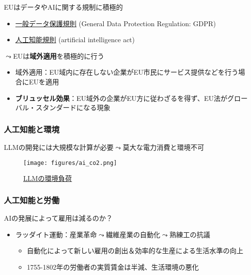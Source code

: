 \documentclass[
  xelatex,
  ja=standard]{bxjsarticle}
\providecommand{\tightlist}{%
  \setlength{\itemsep}{0pt}\setlength{\parskip}{0pt}}\usepackage{longtable,booktabs,array}
\begin{document}
EUはデータやAIに関する規制に積極的

\begin{itemize}
\tightlist
\item
  \href{https://www.ppc.go.jp/enforcement/infoprovision/EU/}{一般データ保護規則}
  (General Data Protection Regulation: GDPR)
\item
  \href{https://www.soumu.go.jp/main_content/000826707.pdf}{人工知能規則}
  (artificial intelligence act)
\end{itemize}

\(\leadsto\)EUは\textbf{域外適用}を積極的に行う

\begin{itemize}
\tightlist
\item
  域外適用：EU域内に存在しない企業がEU市民にサービス提供などを行う場合にEUを適用
\item
  \textbf{ブリュッセル効果}：EU域外の企業がEU方に従わざるを得ず、EU法がグローバル・スタンダードになる現象
\end{itemize}

\hypertarget{ux4ebaux5de5ux77e5ux80fdux3068ux74b0ux5883}{%
\subsubsection{人工知能と環境}\label{ux4ebaux5de5ux77e5ux80fdux3068ux74b0ux5883}}

LLMの開発には大規模な計算が必要\(\leadsto\)莫大な電力消費と環境不可

\begin{figure}[htpb]

{\centering \texttt{[image: figures/ai\_co2.png]}

}

\caption{\href{https://www.gizmodo.jp/2023/04/chatgpt-ai-openai-carbon-emissions-stanford-report.html}{LLMの環境負荷}}

\end{figure}

\hypertarget{ux4ebaux5de5ux77e5ux80fdux3068ux52b4ux50cd}{%
\subsubsection{人工知能と労働}\label{ux4ebaux5de5ux77e5ux80fdux3068ux52b4ux50cd}}

AIの発展によって雇用は減るのか？

\begin{itemize}
\tightlist
\item
  ラッダイト運動：産業革命\(\leadsto\)繊維産業の自動化\(\leadsto\)熟練工の抗議

  \begin{itemize}
  \tightlist
  \item
    自動化によって新しい雇用の創出＆効率的な生産による生活水準の向上
  \item
    1755-1802年の労働者の実質賃金は半減、生活環境の悪化
  \end{itemize}
\end{itemize}
\end{document}

